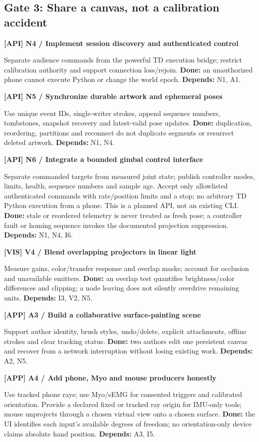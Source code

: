 \documentclass[11pt,a4paper]{article}
\newcommand{\task}[4]{%
  \begin{tcolorbox}[colback=#1!5,colframe=#1,boxrule=0.5pt,
    borderline west={2pt}{0pt}{#1}]
  \textcolor{#1}{\textbf{[#2] #3}}\par #4
  \end{tcolorbox}}
\begin{document}
\subsection{Gate 3: Share a canvas, not a calibration accident}
\task{API}{API}{N4 / Implement session discovery and authenticated control}{
Separate audience commands from the powerful TD execution bridge; restrict
calibration authority and support connection loss/rejoin.
\textbf{Done:} an unauthorized phone cannot execute Python or change the
world epoch. \textbf{Depends:} N1, A1.}
\task{API}{API}{N5 / Synchronize durable artwork and ephemeral poses}{
Use unique event IDs, single-writer strokes, append sequence numbers,
tombstones, snapshot recovery and latest-valid pose updates.
\textbf{Done:} duplication, reordering, partitions and reconnect do not
duplicate segments or resurrect deleted artwork.
\textbf{Depends:} N1, N4.}
\task{API}{API}{N6 / Integrate a bounded gimbal control interface}{
Separate commanded targets from measured joint state; publish controller
modes, limits, health, sequence numbers and sample age. Accept only
allowlisted authenticated commands with rate/position limits and a stop;
no arbitrary TD Python execution from a phone. This is a planned API, not
an existing CLI.
\textbf{Done:} stale or reordered telemetry is never treated as fresh
pose; a controller fault or homing sequence invokes the documented
projection suppression. \textbf{Depends:} N1, N4, I6.}
\task{VIS}{VIS}{V4 / Blend overlapping projectors in linear light}{
Measure gains, color/transfer response and overlap masks; account for
occlusion and unavailable emitters.
\textbf{Done:} an overlap test quantifies brightness/color differences and
clipping; a node leaving does not silently overdrive remaining units.
\textbf{Depends:} I3, V2, N5.}
\task{APP}{APP}{A3 / Build a collaborative surface-painting scene}{
Support author identity, brush styles, undo/delete, explicit attachments,
offline strokes and clear tracking status.
\textbf{Done:} two authors edit one persistent canvas and recover from a
network interruption without losing existing work.
\textbf{Depends:} A2, N5.}
\task{APP}{APP}{A4 / Add phone, Myo and mouse producers honestly}{
Use tracked phone rays; use Myo/sEMG for consented triggers and calibrated
orientation. Provide a declared fixed or tracked ray origin for IMU-only
tools; mouse unprojects through a chosen virtual view onto a chosen surface.
\textbf{Done:} the UI identifies each input's available degrees of freedom;
no orientation-only device claims absolute hand position.
\textbf{Depends:} A3, I5.}
\end{document}
